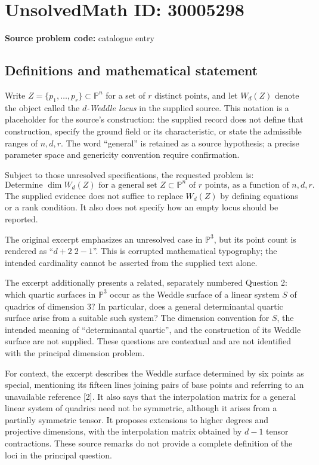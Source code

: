 \documentclass[11pt]{article}
\begin{document}
\section*{UnsolvedMath ID: 30005298}
\textbf{Source problem code:} catalogue entry
\subsection{Definitions and mathematical statement}
Write \(Z=\{p_1,\ldots,p_r\}\subset\mathbb P^n\) for a set of \(r\) distinct points, and let \(W_d(Z)\) denote the object called the \emph{\(d\)-Weddle locus} in the supplied source. This notation is a placeholder for the source's construction: the supplied record does not define that construction, specify the ground field or its characteristic, or state the admissible ranges of \(n,d,r\). The word ``general'' is retained as a source hypothesis; a precise parameter space and genericity convention require confirmation.

Subject to those unresolved specifications, the requested problem is:
\[
\text{Determine }\dim W_d(Z)\text{ for a general set }Z\subset\mathbb P^n\text{ of }r\text{ points, as a function of }n,d,r.
\]
The supplied evidence does not suffice to replace \(W_d(Z)\) by defining equations or a rank condition. It also does not specify how an empty locus should be reported.

The original excerpt emphasizes an unresolved case in \(\mathbb P^3\), but its point count is rendered as ``\(d+2\;2-1\)''. This is corrupted mathematical typography; the intended cardinality cannot be asserted from the supplied text alone.

The excerpt additionally presents a related, separately numbered Question 2: which quartic surfaces in \(\mathbb P^3\) occur as the Weddle surface of a linear system \(S\) of quadrics of dimension \(3\)? In particular, does a general determinantal quartic surface arise from a suitable such system? The dimension convention for \(S\), the intended meaning of ``determinantal quartic'', and the construction of its Weddle surface are not supplied. These questions are contextual and are not identified with the principal dimension problem.

For context, the excerpt describes the Weddle surface determined by six points as special, mentioning its fifteen lines joining pairs of base points and referring to an unavailable reference [2]. It also says that the interpolation matrix for a general linear system of quadrics need not be symmetric, although it arises from a partially symmetric tensor. It proposes extensions to higher degrees and projective dimensions, with the interpolation matrix obtained by \(d-1\) tensor contractions. These source remarks do not provide a complete definition of the loci in the principal question.
\end{document}
